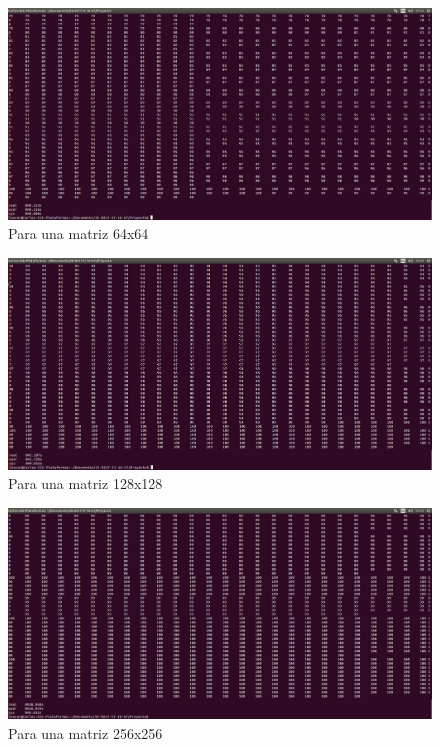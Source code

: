 \documentclass[11pt]{article}
\begin{document}
\begin{figure}[H]
\centering
\includegraphics[scale=0.5]{64x64.jpg}
\caption{Para una matriz 64x64}
\label{fig:11}
\end{figure}

\begin{figure}[H]
\centering
\includegraphics[scale=0.5]{128x128.jpg}
\caption{Para una matriz 128x128}
\label{fig:12}
\end{figure}

\begin{figure}[H]
\centering
\includegraphics[scale=0.5]{256x256.jpg}
\caption{Para una matriz 256x256}
\label{fig:13}
\end{figure}
\end{document}
